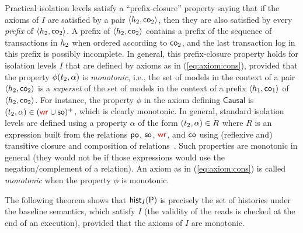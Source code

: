 Practical isolation levels satisfy a ``prefix-closure'' property saying that if the axioms of $I$ are satisfied by a pair $\tup{\hist_2,\co_2}$, then they are also satisfied by every \emph{prefix} of $\tup{\hist_2,\co_2}$. A prefix of $\tup{\hist_2,\co_2}$ contains a prefix of the sequence of transactions in $\hist_2$ when ordered according to $\co_2$, and the last transaction log in this prefix is possibly incomplete.
In general, this prefix-closure property holds for isolation levels $I$ that are defined by axioms as in (\ref{eq:axiom:cons}), provided that the property $\phi(\tr_2,\alpha)$ is \emph{monotonic}, i.e., the set of models in the context of a pair $\tup{\hist_2,\co_2}$ is a \emph{superset} of the set of models in the context of a prefix $ \tup{\hist_1,\co_1}$ of $\tup{\hist_2,\co_2}$. For instance, the property $\phi$ in the axiom defining $\mathsf{Causal}$ is $(\tr_2,\alpha)\in (\wro \cup \so)^+$, which is clearly monotonic. In general, standard isolation levels are defined using a property $\alpha$ of the form $(\tr_2,\alpha)\in R$ where $R$ is an expression built from the relations $\po$, $\so$, $\wro$, and $\co$ using (reflexive and) transitive closure and composition of relations~\cite{DBLP:journals/pacmpl/BiswasE19}. Such properties are monotonic in general (they would not be if those expressions would use the negation/complement of a relation).  An axiom as in (\ref{eq:axiom:cons}) is called \emph{monotonic} when the property $\phi$ is monotonic. 

The following theorem shows that $\histOf[I]{\prog}$ is precisely the set of histories under the baseline semantics, which satisfy $I$ (the validity of the reads is checked at the end of an execution), provided that the axioms of $I$ are monotonic.

